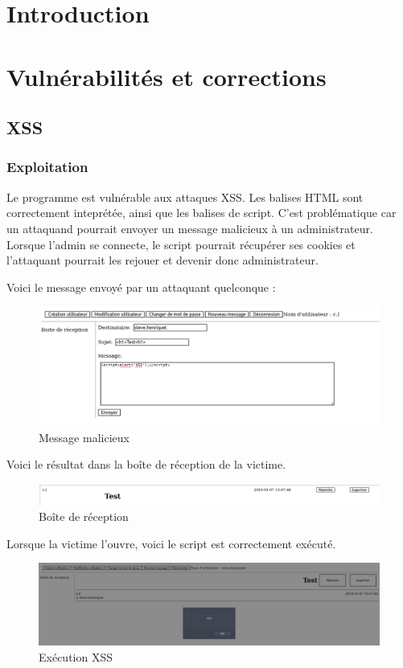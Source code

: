 \documentclass[12pt]{article}
\begin{document}


\tableofcontents

\newpage
\section{Introduction}


\section{Vulnérabilités et corrections}
\subsection{XSS}
\subsubsection{Exploitation}
Le programme est vulnérable aux attaques XSS. Les balises HTML sont correctement inteprétée, ainsi que les balises de script. C'est problématique car un attaquand pourrait envoyer un message malicieux à un administrateur. Lorsque l'admin se connecte, le script pourrait récupérer ses cookies et l'attaquant pourrait les rejouer et devenir donc administrateur.

Voici le message envoyé par un attaquant quelconque : 
\begin{figure}[H]
\centering
\includegraphics[width=\linewidth]{images/xssAttack.png}
\caption{Message malicieux}
\end{figure}

Voici le résultat dans la boîte de réception de la victime.
\begin{figure}[H]
\centering
\includegraphics[width=\linewidth]{images/xssRecep.png}
\caption{Boîte de réception}
\end{figure}

Lorsque la victime l'ouvre, voici le script est correctement exécuté.
\begin{figure}[H]
\centering
\includegraphics[width=\linewidth]{images/xssOpen.png}
\caption{Exécution XSS}
\end{figure}
\end{document}
